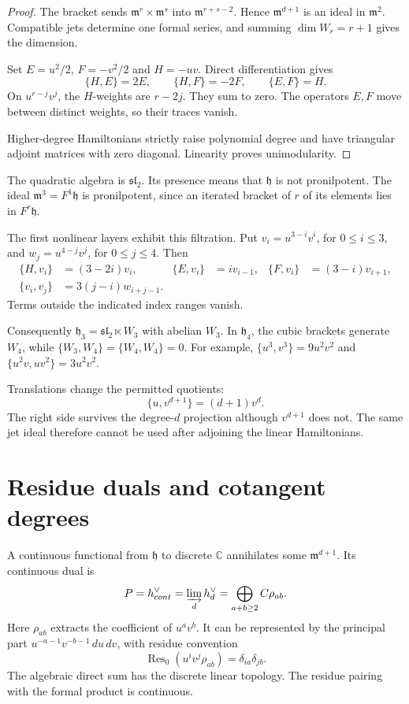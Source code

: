 \begin{proof}
The bracket sends $\mathfrak m^r\times\mathfrak m^s$ into
$\mathfrak m^{r+s-2}$. Hence $\mathfrak m^{d+1}$ is an ideal
in $\mathfrak m^2$. Compatible jets determine one formal series,
and summing $\dim W_r=r+1$ gives the dimension.

Set $E=u^2/2$, $F=-v^2/2$ and $H=-uv$. Direct differentiation gives
\[
 \{H,E\}=2E,\qquad \{H,F\}=-2F,\qquad \{E,F\}=H.
\]
On $u^{r-j}v^j$, the $H$-weights are $r-2j$.
They sum to zero. The operators $E,F$ move between distinct weights,
so their traces vanish.

Higher-degree Hamiltonians strictly raise
polynomial degree and have triangular adjoint matrices with zero
diagonal. Linearity proves unimodularity.
\end{proof}

The quadratic algebra is $\mathfrak{sl}_2$. Its presence means that
$\mathfrak h$ is not pronilpotent. The ideal
$\mathfrak m^3=F^1\mathfrak h$ is pronilpotent, since an iterated
bracket of $r$ of its elements lies in $F^r\mathfrak h$.

The first nonlinear layers exhibit this filtration. Put
$v_i=u^{3-i}v^i$, for $0\leq i\leq3$, and
$w_j=u^{4-j}v^j$, for $0\leq j\leq4$. Then
\begin{align*}
 \{H,v_i\}&=(3-2i)v_i,&
 \{E,v_i\}&=iv_{i-1},&
 \{F,v_i\}&=(3-i)v_{i+1},\\
 \{v_i,v_j\}&=3(j-i)w_{i+j-1}.
\end{align*}
Terms outside the indicated index ranges vanish.

Consequently $\mathfrak h_3=\mathfrak{sl}_2\ltimes W_3$ with
abelian $W_3$. In $\mathfrak h_4$, the cubic brackets generate
$W_4$, while $\{W_3,W_4\}=\{W_4,W_4\}=0$.
For example, $\{u^3,v^3\}=9u^2v^2$ and
$\{u^2v,uv^2\}=3u^2v^2$.

Translations change the permitted quotients:
\[
 \{u,v^{d+1}\}=(d+1)v^d.
\]
The right side survives the degree-$d$ projection although
$v^{d+1}$ does not. The same jet ideal therefore cannot be used
after adjoining the linear Hamiltonians.

\section{Residue duals and cotangent degrees}

A continuous functional from $\mathfrak h$ to discrete $\mathbb C$
annihilates some $\mathfrak m^{d+1}$. Its continuous dual is
\[
 P=\mathfrak h^\vee_{\mathrm{cont}}
    =\varinjlim_d\mathfrak h_d^\vee
    =\bigoplus_{a+b\geq2}\mathbb C\rho_{ab}.
\]
Here $\rho_{ab}$ extracts the coefficient of $u^av^b$.
It can be represented by the principal part
$u^{-a-1}v^{-b-1}\,du\,dv$, with residue convention
\[
 \operatorname{Res}_0(u^iv^j\rho_{ab})=\delta_{ia}\delta_{jb}.
\]
The algebraic direct sum has the discrete linear topology.
The residue pairing with the formal product is continuous.

